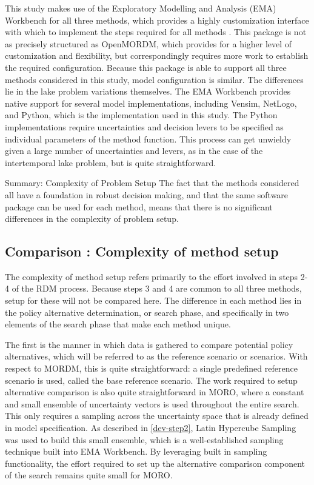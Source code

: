     This study makes use of the Exploratory Modelling and Analysis (EMA) Workbench for all three methods, which provides a highly customization interface with which to implement the steps required for all methods \citep{Kwakkel2017}. This package is not as precisely structured as OpenMORDM, which provides for a higher level of customization and flexibility, but correspondingly requires more work to establish the required configuration. Because this package is able to support all three methods considered in this study, model configuration is similar. The differences lie in the lake problem variations themselves. The EMA Workbench provides native support for several model implementations, including Vensim, NetLogo, and Python, which is the implementation used in this study. The Python implementations require uncertainties and decision levers to be specified as individual parameters of the method function. This process can get unwieldy given a large number of uncertainties and levers, as in the case of the intertemporal lake problem, but is quite straightforward. 
    
    \begin{comparisonbox}{Summary: Complexity of Problem Setup}
        The fact that the methods considered all have a foundation in robust decision making, and that the same software package can be used for each method, means that there is no significant differences in the complexity of problem setup. 
    \end{comparisonbox}

    \subsection{Comparison \thecomparison : Complexity of method setup}
    The complexity of method setup refers primarily to the effort involved in steps 2-4 of the RDM process. Because steps 3 and 4 are common to all three methods, setup for these will not be compared here. The difference in each method lies in the policy alternative determination, or search phase, and specifically in two elements of the search phase that make each method unique. 
    
    The first is the manner in which data is gathered to compare potential policy alternatives, which will be referred to as the reference scenario or scenarios. With respect to MORDM, this is quite straightforward: a single predefined reference scenario is used, called the base reference scenario. The work required to setup alternative comparison is also quite straightforward in MORO, where a constant and small ensemble of uncertainty vectors is used throughout the entire search. This only requires a sampling across the uncertainty space that is already defined in model specification. As described in \cref{dev-step2}, Latin Hypercube Sampling was used to build this small ensemble, which is a well-established sampling technique built into EMA Workbench. By leveraging built in sampling functionality, the effort required to set up the alternative comparison component of the search remains quite small for MORO. 
    
